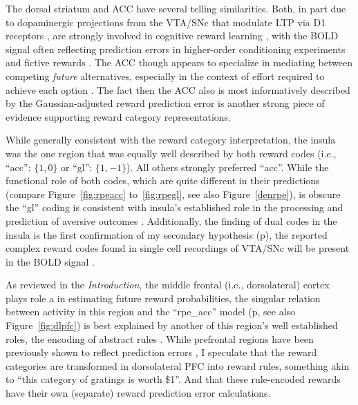 The dorsal striatum and ACC have several telling similarities.  Both, in part due to dopaminergic projections from the VTA/SNc that modulate LTP via D1 receptors \cite{Schweimer:2006p9780}, are strongly involved in cognitive reward learning \cite{Atlas:2010p7566,Hayden:2009p6545,Rudebeck:2008p4712,Rolls:2008p7577,Quilodran:2008p2645,Hampton:2007p2983,Ernst:2004p3998}, with the BOLD signal often reflecting prediction errors in higher-order conditioning experiments \cite{seymour:2004aa} and fictive rewards \cite{Hayden:2009p6545}.  The ACC though appears to specialize in mediating between competing \emph{future} alternatives, especially in the context of effort required to achieve each option \cite{Quilodran:2008p2645}.  The fact then the ACC also is most informatively described by the Gaussian-adjusted reward prediction error is another strong piece of evidence supporting reward category representations.  

While generally consistent with the reward category interpretation, the insula was the one region that was equally well described by both reward codes (i.e., ``acc'': $\{1,0\}$ or ``gl'': $\{1,-1\}$).  All others strongly preferred ``acc''.  While the functional role of both codes, which are quite different in their predictions (compare Figure~\ref{fig:rpeacc} to~\ref{fig:rpegl}, see also Figure~\ref{denrpe}), is obscure the ``gl'' coding is consistent with insula's established role in the processing and prediction of aversive outcomes \cite{Chua:1999p9833,Phillips:1998p9834,Buchel:1998p9836,Elliott:2000p1637}.  Additionally, the finding of dual codes in the insula is the first confirmation of my secondary hypothesis (p\pageref{subsub:codesandfits}), the reported complex reward codes found in single cell recordings of VTA/SNc will be present in the BOLD signal \cite{Kim:2006p1063,Matsumoto:2009p7219,Smith:2011p8133}.

As reviewed in the \emph{Introduction}, the middle frontal (i.e., dorsolateral) cortex plays role a in estimating future reward probabilities, the singular relation between activity in this region and the ``rpe\_acc'' model (p\pageref{subsub:onsheet}, see also Figure~\ref{fig:dlpfc}) is best explained by another of this region's well established roles, the encoding of abstract rules \cite{Wallis:2001p8129}.  While prefrontal regions have been previously shown to reflect prediction errors \cite{Ramnani:2004p5390}, I speculate that the reward categories are transformed in dorsolateral PFC into reward rules, something akin to ``this category of gratings is worth \$1''.  And that these rule-encoded rewards have their own (separate) reward prediction error calculations.

